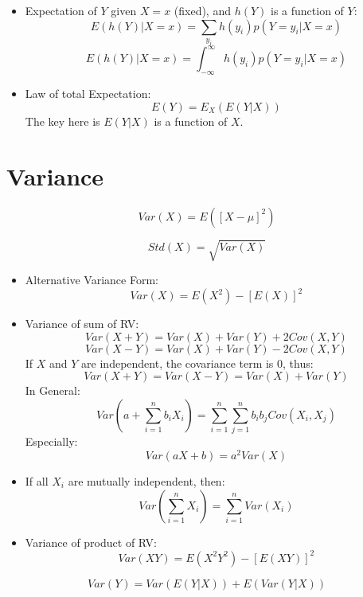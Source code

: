 \documentclass[12pt]{article}
\begin{document}
\begin{multicols*}{4}
\begin{tcolorbox}[title=Conditional Expectation]
        \begin{itemize}[leftmargin=*]
            \item Expectation of $Y$ given $X=x$ (fixed), and $h(Y)$ is a function of $Y$:
                  $$E(h(Y)|X=x)=\sum_{y_i}h(y_i)p(Y=y_i|X=x)$$
                  $$E(h(Y)|X=x)=\int_{-\infty}^\infty h(y_i)p(Y=y_i|X=x)$$
            \item Law of total Expectation:
                  $$E(Y)=E_X(E(Y|X))$$
                  The key here is $E(Y|X)$ is a function of $X$.
        \end{itemize}
    \end{tcolorbox}
    \section{Variance}
    $$Var(X)=E([X-\mu]^2)$$
    \begin{tcolorbox}[title=Standard Deviation]
        $$Std(X)=\sqrt{Var(X)}$$
    \end{tcolorbox}
    \begin{tcolorbox}[title=Properties of Variance]
        \begin{itemize}[leftmargin=*]
            \item Alternative Variance Form:
                  $$Var(X)=E(X^2)-[E(X)]^2$$
            \item Variance of sum of RV:
                  $$Var(X+Y)=Var(X)+Var(Y)+2Cov(X, Y)$$
                  $$Var(X-Y)=Var(X)+Var(Y)-2Cov(X, Y)$$
                  If $X$ and $Y$ are independent, the covariance term is $0$, thus:
                  $$Var(X+Y)=Var(X-Y)=Var(X)+Var(Y)$$
                  In General:
                  $$Var\left(a+\sum_{i=1}^nb_iX_i\right)=\sum_{i=1}^n\sum_{j=1}^nb_ib_jCov(X_i, X_j)$$
                  Especially:
                  $$Var(aX+b)=a^2Var(X)$$
            \item If all $X_i$ are mutually independent, then:
                  $$Var\left(\sum_{i=1}^nX_i\right)=\sum_{i=1}^nVar(X_i)$$
            \item Variance of product of RV:
                  $$Var(XY)=E(X^2Y^2)-[E(XY)]^2$$
        \end{itemize}
    \end{tcolorbox}
    \begin{tcolorbox}[title=Law of total Variance]
        $$Var(Y)=Var(E(Y|X))+E(Var(Y|X))$$
    \end{tcolorbox}
    \begin{tcolorbox}[title=Covariance]
        \begin{itemize}[leftmargin=*]

\end{itemize}
\end{tcolorbox}
\end{multicols*}
\end{document}
